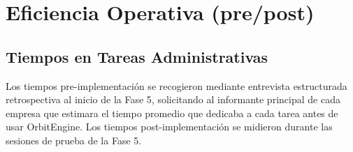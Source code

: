 \section{Eficiencia Operativa (pre/post)}\label{eficiencia-operativa-prepost}

\subsection{Tiempos en Tareas Administrativas}\label{tiempos-en-tareas-administrativas}

Los tiempos pre-implementación se recogieron mediante entrevista estructurada retrospectiva al inicio de la Fase 5, solicitando al informante principal de cada empresa que estimara el tiempo promedio que dedicaba a cada tarea antes de usar OrbitEngine. Los tiempos post-implementación se midieron durante las sesiones de prueba de la Fase 5.


